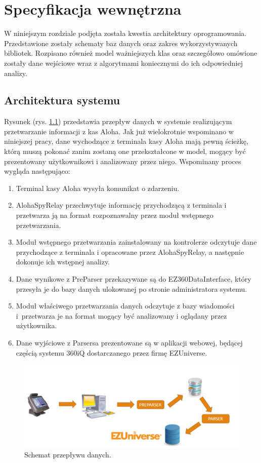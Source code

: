 \documentclass[a4paper]{book}
\begin{document}
\chapter{Specyfikacja wewnętrzna}
\label{rozdzial5}
W niniejszym rozdziale podjęta została kwestia architektury oprogramowania. Przedstawione zostały schematy baz danych oraz zakres wykorzystywanych bibliotek. Rozpisano również model ważniejszych klas oraz szczegółowo omówione zostały dane wejściowe wraz z algorytmami koniecznymi do ich odpowiedniej analizy.
\section{Architektura systemu}
Rysunek (rys. \ref{fig:schemat_przeplywu_danych}) przedstawia przepływ danych w systemie realizującym przetwarzanie informacji z kas Aloha.
Jak już wielokrotnie wspominano w niniejszej pracy, dane wychodzące z terminala kasy Aloha mają pewną ścieżkę, którą muszą pokonać zanim zostaną one przekształcone w model, mogący być prezentowany użytkownikowi i analizowany przez niego. Wspominany proces wygląda następująco:
 \begin{enumerate}
	\item Terminal kasy Aloha wysyła komunikat o zdarzeniu.
	\item AlohaSpyRelay przechwytuje informację przychodzącą z terminala i przetwarza ją na format rozpoznawalny przez moduł wstępnego przetwarzania.
	\item Moduł wstępnego przetwarzania zainstalowany na kontrolerze odczytuje dane przychodzące z terminala i opracowane przez AlohaSpyRelay, a następnie dokonuje ich wstępnej analizy.
	\item Dane wynikowe z PreParser przekazywane są do EZ360DataInterface, który przesyła je do bazy danych ulokowanej po stronie administratora systemu.
	\item Moduł właściwego przetwarzania danych odczytuje z bazy wiadomości i~przetwarza je na format mogący być analizowany i oglądany przez użytkownika.
	\item Dane wyjściowe z Parsersa prezentowane są w aplikacji webowej, będącej częścią systemu 360iQ dostarczanego przez firmę EZUniverse.
\end{enumerate}
\begin{figure}[t]
	\centering
	\includegraphics[width=\textwidth]{./img/schemat_przeplywu_danych.png}
	\caption{Schemat przepływu danych.}
	\label{fig:schemat_przeplywu_danych}
\end{figure}
\end{document}
